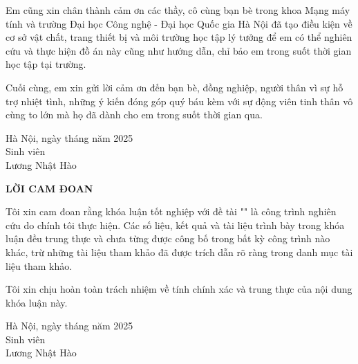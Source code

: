 \begin{titlepage}
    Em cũng xin chân thành cảm ơn các thầy, cô cùng bạn bè trong khoa Mạng máy tính và trường Đại học Công nghệ - Đại học Quốc gia Hà Nội đã tạo điều kiện về cơ sở vật chất, trang thiết bị và môi trường học tập lý tưởng để em có thể nghiên cứu và thực hiện đồ án này cũng như hướng dẫn, chỉ bảo em trong suốt thời gian học tập tại trường.

    Cuối cùng, em xin gửi lời cảm ơn đến bạn bè, đồng nghiệp, người thân vì sự hỗ trợ nhiệt tình, những ý kiến đóng góp quý báu kèm với sự động viên tinh thân vô cùng to lớn mà họ đã dành cho em trong suốt thời gian qua.

    \begin{flushright}
        \begin{minipage}{0.6\linewidth}
            \begin{center}
                Hà Nội, ngày  tháng  năm 2025\\
                Sinh viên\\
                \vspace{2cm}
                Lương Nhật Hào
            \end{center}
        \end{minipage}
    \end{flushright}

    \newpage
    \begin{center}
        \textbf{\fontsize{12}{14.4}\selectfont\uppercase{{Lời cam đoan}}}
    \end{center}

    Tôi xin cam đoan rằng khóa luận tốt nghiệp với đề tài "\tenKL" là công trình nghiên cứu do chính tôi thực hiện. Các số liệu, kết quả và tài liệu trình bày trong khóa luận đều trung thực và chưa từng được công bố trong bất kỳ công trình nào khác, trừ những tài liệu tham khảo đã được trích dẫn rõ ràng trong danh mục tài liệu tham khảo.

    Tôi xin chịu hoàn toàn trách nhiệm về tính chính xác và trung thực của nội dung khóa luận này.
    \begin{flushright}
        \begin{minipage}{0.6\linewidth}
            \begin{center}
                Hà Nội, ngày  tháng  năm 2025\\
                Sinh viên\\
                \vspace{2cm}
                Lương Nhật Hào
            \end{center}
        \end{minipage}
    \end{flushright}
    \newpage

\end{titlepage}